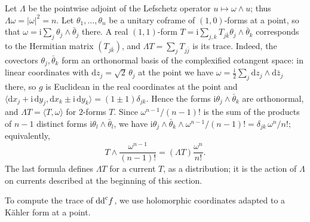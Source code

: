 Let $\Lambda$ be the pointwise adjoint of the Lefschetz operator $u\mapsto\omega\wedge u$; thus $\Lambda\omega=|\omega|^2=n$. Let $\theta_1,\ldots,\theta_n$ be a unitary coframe of $(1,0)$-forms at a point, so that $\omega=\mathrm i\sum_j\theta_j\wedge\bar\theta_j$ there. A real $(1,1)$-form $T=\mathrm i\sum_{j,k}T_{j\bar k}\theta_j\wedge\bar\theta_k$ corresponds to the Hermitian matrix $(T_{j\bar k})$, and $\Lambda T=\sum_jT_{j\bar j}$ is its trace. Indeed, the covectors $\theta_j,\bar\theta_k$ form an orthonormal basis of the complexified cotangent space: in linear coordinates with $\mathrm dz_j=\sqrt2\,\theta_j$ at the point we have $\omega=\frac{\mathrm i}{2}\sum_j\mathrm dz_j\wedge\mathrm d\bar z_j$ there, so $g$ is Euclidean in the real coordinates at the point and $\langle\mathrm dx_j+\mathrm i\,\mathrm dy_j,\mathrm dx_k\pm\mathrm i\,\mathrm dy_k\rangle=(1\pm1)\delta_{jk}$. Hence the forms $\mathrm i\theta_j\wedge\bar\theta_k$ are orthonormal, and $\Lambda T=\langle T,\omega\rangle$ for $2$-forms $T$. Since $\omega^{n-1}/(n-1)!$ is the sum of the products of $n-1$ distinct forms $\mathrm i\theta_l\wedge\bar\theta_l$, we have $\mathrm i\theta_j\wedge\bar\theta_k\wedge\omega^{n-1}/(n-1)!=\delta_{jk}\,\omega^n/n!$; equivalently,
\[
 T\wedge\frac{\omega^{n-1}}{(n-1)!}=(\Lambda T)\frac{\omega^n}{n!}.
\]
The last formula defines $\Lambda T$ for a current $T$, as a distribution; it is the action of $\Lambda$ on currents described at the beginning of this section.

To compute the trace of $\mathrm{dd}^{\mathrm{c}} f$, we use holomorphic coordinates adapted to a K\"ahler form at a point.

